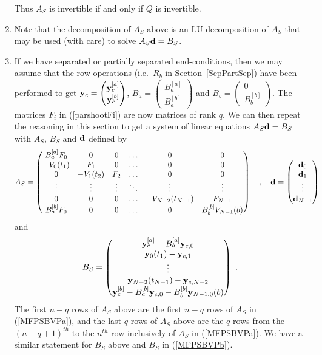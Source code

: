 \begin{rmkList}
\begin{enumerate}
Thus $A_S$ is invertible if and only if $Q$ is invertible.
\item Note that the decomposition of $A_S$ above is an LU
decomposition of $A_S$ that may be used (with care) to solve
$A_S \mathbf{d} = B_S$.
\item If we have separated or partially separated end-conditions, then
we may assume that the row operations (i.e.\ $R_b$ in
Section~\ref{SepPartSep}) have been performed to get
$\displaystyle \mathbf{y}_c = \begin{pmatrix} \mathbf{y}_c^{[a]} \\ \mathbf{y}_c^{[b]}
\end{pmatrix}$, 
$\displaystyle B_a = \begin{pmatrix} B_a^{[a]} \\ B_a^{[b]}\end{pmatrix}$ and
$\displaystyle B_b = \begin{pmatrix} 0 \\ B_b^{[b]} \end{pmatrix}$.
The matrices $F_i$ in (\ref{parshootFi}) are now 
matrices of rank $q$.  We can then repeat the reasoning in this
section to get a system of linear equations $A_S \mathbf{d} = B_S$ with $A_S$,
$B_S$ and $\mathbf{d}$ defined by
\[
A_S = \begin{pmatrix}
B_a^{[a]} F_0 & 0 & 0 & \ldots & 0 & 0 \\
-V_0(t_1) & F_1 & 0 & \ldots & 0 & 0 \\
0 & -V_1(t_2) & F_2 & \ldots & 0 & 0 \\
\vdots & \vdots & \vdots & \ddots & \vdots & \vdots \\
0 & 0 & 0 & \ldots & -V_{N-2}(t_{N-1}) & F_{N-1} \\
B_a^{[b]} F_0 & 0 & 0 & \ldots & 0 & B_b^{[b]} V_{N-1}(b)
\end{pmatrix}
\quad , \quad
\mathbf{d} = \begin{pmatrix} \mathbf{d}_0 \\ \mathbf{d}_1 \\ \vdots \\
\mathbf{d}_{N-1} \end{pmatrix}
\]
and
\[
B_S = \begin{pmatrix}
\mathbf{y}_c^{[a]} - B_a^{[a]} \mathbf{y}_{c,0} \\
\mathbf{y}_0(t_1) - \mathbf{y}_{c,1} \\
\vdots \\
\mathbf{y}_{N-2}(t_{N-1}) - \mathbf{y}_{c,N-2}\\
\mathbf{y}_{c}^{[b]} - B_a^{[b]} \mathbf{y}_{c,0} - B_b^{[b]} \mathbf{y}_{N-1,0}(b)
\end{pmatrix} \ .
\]
The first $n-q$ rows of $A_S$ above are the first $n-q$ rows of $A_S$
in (\ref{MFPSBVPa}), and the last $q$ rows of $A_S$ above are
the $q$ rows from the $(n-q+1)^{th}$ to the $n^{th}$ row inclusively
of $A_S$ in (\ref{MFPSBVPa}).  We have a similar statement for $B_S$
above and $B_S$ in (\ref{MFPSBVPb}).


\end{enumerate}
\end{rmkList}
